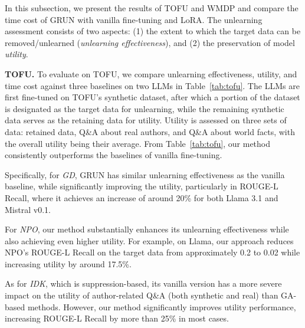 
In this subsection, we present the results of TOFU and WMDP and compare the time cost of GRUN with vanilla fine-tuning and LoRA. The unlearning assessment consists of two aspects: (1) the extent to which the target data can be removed/unlearned (\textit{unlearning effectiveness}), and (2) the preservation of model \textit{utility}.

\noindent\textbf{TOFU.} To evaluate on TOFU, we compare unlearning effectiveness, utility, and time cost against three baselines on two LLMs in Table~\ref{tab:tofu}. The LLMs are first fine-tuned on TOFU’s synthetic dataset, after which a portion of the dataset is designated as the target data for unlearning, while the remaining synthetic data serves as the retaining data for utility. Utility is assessed on {three sets of data}: retained data, Q\&A about real authors, and Q\&A about world facts, with the overall utility being their average. From Table~\ref{tab:tofu}, our method consistently outperforms the baselines of vanilla fine-tuning. 

Specifically, for \textit{GD}, GRUN has similar unlearning effectiveness as the vanilla baseline,
while significantly improving the utility, particularly in ROUGE-L Recall, where it achieves an increase of around 20\% for both Llama 3.1 and Mistral v0.1.

For \textit{NPO}, our method substantially enhances its unlearning effectiveness while also achieving even higher utility. For example, on Llama, our approach reduces NPO’s ROUGE-L Recall on the target data from approximately 0.2 to 0.02 while increasing utility by around 17.5\%. 

As for \textit{IDK}, which is suppression-based, its vanilla version has a more severe impact on the utility of author-related Q\&A (both synthetic and real) than GA-based methods. However, our method significantly improves utility performance, increasing ROUGE-L Recall by more than 25\% in most cases. 

